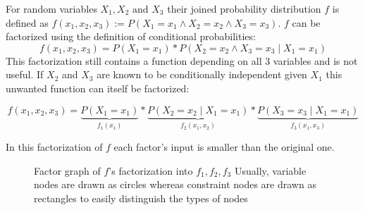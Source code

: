 \begin{example}
For random variables $X_1, X_2 \text{ and } X_3$ their joined probability distribution $f$ is defined as $f(x_1, x_2, x_3) := P(X_1 = x_1 \land X_2  = x_2 \land X_3 = x_3)$. 
$f$ can be factorized using the definition of conditional probabilities: $$f(x_1, x_2, x_3) = P(X_1 = x_1) * P(X_2 = x_2 \land X_3 = x_3 \; | \; X_1 = x_1)$$
This factorization still contains a function depending on all $3$ variables and is not useful. If $X_2$ and $X_3$ are known to be conditionally independent given $X_1$ this unwanted function can itself be factorized:

$$f(x_1, x_2, x_3) = \underbrace{P(X_1 = x_1)}_{f_1(x_1)} * \underbrace{P(X_2 = x_2 \; | \; X_1 = x_1)}_{f_2(x_1, x_2)} * \underbrace{P(X_3 = x_3 \; | \; X_1 = x_1)}_{f_3(x_1, x_3)}$$

In this factorization of $f$ each factor's input is smaller than the original one.

\begin{figure}
\centering

\caption{Factor graph of $f$'s factorization into $f_1, f_2, f_3$ \newline Usually, variable nodes are drawn as circles whereas constraint nodes are drawn as rectangles to easily distinguish the types of nodes}

\end{figure}



\end{example}
%

